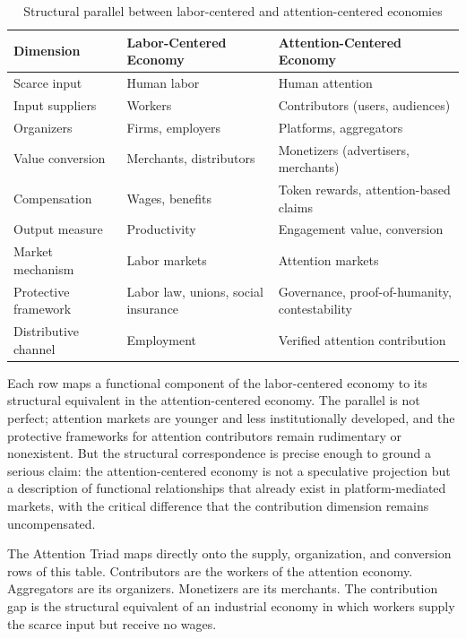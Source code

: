 \documentclass[12pt, a4paper]{article}
\begin{document}
\begin{table}[H]
\centering
\caption{Structural parallel between labor-centered and attention-centered economies}
\label{tab:parallel}
\begin{tabularx}{\textwidth}{lXX}
\toprule
\textbf{Dimension} & \textbf{Labor-Centered Economy} & \textbf{Attention-Centered Economy} \\
\midrule
Scarce input & Human labor & Human attention \\
Input suppliers & Workers & Contributors (users, audiences) \\
Organizers & Firms, employers & Platforms, aggregators \\
Value conversion & Merchants, distributors & Monetizers (advertisers, merchants) \\
Compensation & Wages, benefits & Token rewards, attention-based claims \\
Output measure & Productivity & Engagement value, conversion \\
Market mechanism & Labor markets & Attention markets \\
Protective framework & Labor law, unions, social insurance & Governance, proof-of-humanity, contestability \\
Distributive channel & Employment & Verified attention contribution \\
\bottomrule
\end{tabularx}
\end{table}

Each row maps a functional component of the labor-centered economy to its structural equivalent in the attention-centered economy. The parallel is not perfect; attention markets are younger and less institutionally developed, and the protective frameworks for attention contributors remain rudimentary or nonexistent. But the structural correspondence is precise enough to ground a serious claim: the attention-centered economy is not a speculative projection but a description of functional relationships that already exist in platform-mediated markets, with the critical difference that the contribution dimension remains uncompensated.

The Attention Triad maps directly onto the supply, organization, and conversion rows of this table. Contributors are the workers of the attention economy. Aggregators are its organizers. Monetizers are its merchants. The contribution gap is the structural equivalent of an industrial economy in which workers supply the scarce input but receive no wages.
\end{document}
